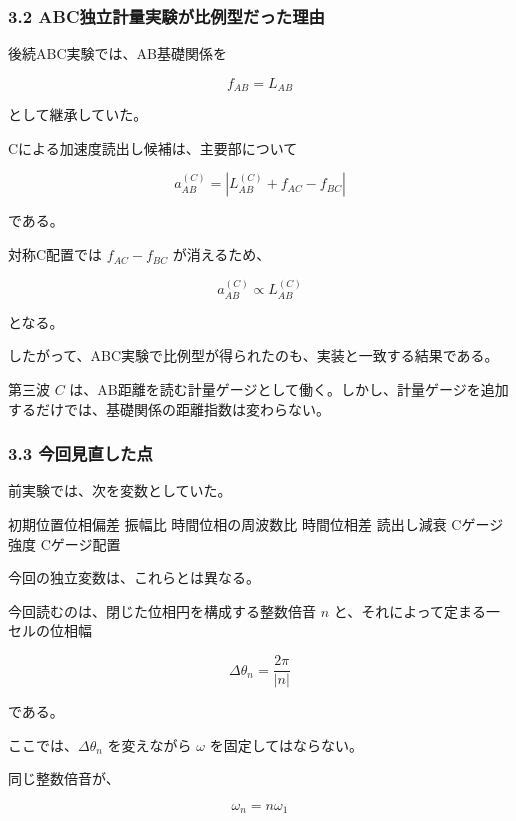 \documentclass[
  10pt,
  a4paper,
]{ltjsarticle}
\newenvironment{Shaded}{}{}
\newcommand{\NormalTok}[1]{#1}
\begin{document}
\subsubsection{3.2
ABC独立計量実験が比例型だった理由}\label{abcux72ecux7acbux8a08ux91cfux5b9fux9a13ux304cux6bd4ux4f8bux578bux3060ux3063ux305fux7406ux7531}

後続ABC実験では、AB基礎関係を

\[
f_{AB}=L_{AB}
\]

として継承していた。

Cによる加速度読出し候補は、主要部について

\[
a_{AB}^{(C)}
=\left|L_{AB}^{(C)}+f_{AC}-f_{BC}\right|
\]

である。

対称C配置では \(f_{AC}-f_{BC}\) が消えるため、

\[
a_{AB}^{(C)}\propto L_{AB}^{(C)}
\]

となる。

したがって、ABC実験で比例型が得られたのも、実装と一致する結果である。

第三波 \(C\)
は、AB距離を読む計量ゲージとして働く。しかし、計量ゲージを追加するだけでは、基礎関係の距離指数は変わらない。

\subsubsection{3.3
今回見直した点}\label{ux4ecaux56deux898bux76f4ux3057ux305fux70b9}

前実験では、次を変数としていた。

\begin{Shaded}
\begin{Highlighting}[]
\NormalTok{初期位置位相偏差}
\NormalTok{振幅比}
\NormalTok{時間位相の周波数比}
\NormalTok{時間位相差}
\NormalTok{読出し減衰}
\NormalTok{Cゲージ強度}
\NormalTok{Cゲージ配置}
\end{Highlighting}
\end{Shaded}

今回の独立変数は、これらとは異なる。

今回読むのは、閉じた位相円を構成する整数倍音 \(n\)
と、それによって定まる一セルの位相幅

\[
\Delta\theta_n=\frac{2\pi}{|n|}
\]

である。

ここでは、\(\Delta\theta_n\) を変えながら \(\omega\)
を固定してはならない。

同じ整数倍音が、

\[
\omega_n=n\omega_1
\]
\end{document}
